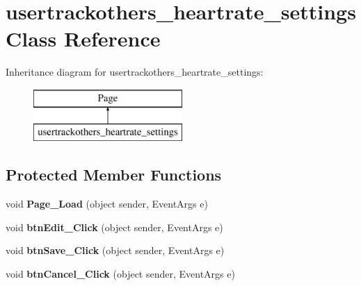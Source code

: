 \hypertarget{classusertrackothers__heartrate__settings}{\section{usertrackothers\-\_\-heartrate\-\_\-settings Class Reference}
\label{classusertrackothers__heartrate__settings}
}
Inheritance diagram for usertrackothers\-\_\-heartrate\-\_\-settings\-:\begin{figure}[H]
\begin{center}
\leavevmode
\includegraphics[height=2.000000cm]{classusertrackothers__heartrate__settings}
\end{center}
\end{figure}
\subsection*{Protected Member Functions}
\begin{DoxyCompactItemize}
\item 
\hypertarget{classusertrackothers__heartrate__settings_a541918d58fc5903812708f8ed931cd67}{void {\bfseries Page\-\_\-\-Load} (object sender, Event\-Args e)}\label{classusertrackothers__heartrate__settings_a541918d58fc5903812708f8ed931cd67}

\item 
\hypertarget{classusertrackothers__heartrate__settings_ad7035f0af000563d6dde277287f4e23c}{void {\bfseries btn\-Edit\-\_\-\-Click} (object sender, Event\-Args e)}\label{classusertrackothers__heartrate__settings_ad7035f0af000563d6dde277287f4e23c}

\item 
\hypertarget{classusertrackothers__heartrate__settings_a66f675afabe03e0e73f822c90a4d316b}{void {\bfseries btn\-Save\-\_\-\-Click} (object sender, Event\-Args e)}\label{classusertrackothers__heartrate__settings_a66f675afabe03e0e73f822c90a4d316b}

\item 
\hypertarget{classusertrackothers__heartrate__settings_a4ebd101fd754fad659aebf8a488ee0db}{void {\bfseries btn\-Cancel\-\_\-\-Click} (object sender, Event\-Args e)}\label{classusertrackothers__heartrate__settings_a4ebd101fd754fad659aebf8a488ee0db}

\end{DoxyCompactItemize}


